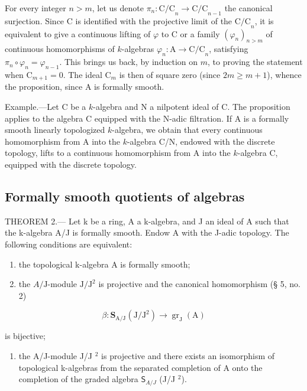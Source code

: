 For every integer \(n > m\), let us denote \(\pi_n: \mathrm{C/C}_n \to \mathrm{C/C}_{n-1}\) the canonical surjection. Since C is identified with the projective limit of the \(\mathrm{C/C}_n\), it is equivalent to give a continuous lifting of \(\varphi\) to C or a family \((\varphi_n)_{n > m}\) of continuous homomorphisms of \(k\)-algebras \(\varphi_n: \mathrm{A} \to \mathrm{C/C}_n\), satisfying \(\pi_n \circ \varphi_n = \varphi_{n-1}\). This brings us back, by induction on \(m\), to proving the statement when \(\mathrm{C}_{m+1} = 0\). The ideal \(\mathrm{C}_m\) is then of square zero (since \(2m \geqslant m+1\)), whence the proposition, since A is formally smooth.

Example.—Let C be a \(k\)-algebra and N a nilpotent ideal of C. The proposition applies to the algebra C equipped with the N-adic filtration. If A is a formally smooth linearly topologized \(k\)-algebra, we obtain that every continuous homomorphism from A into the \(k\)-algebra C/N, endowed with the discrete topology, lifts to a continuous homomorphism from A into the \(k\)-algebra C, equipped with the discrete topology.

\subsection{Formally smooth quotients of algebras}

THEOREM 2.--- Let k be a ring, A a k-algebra, and J an ideal of A such that the k-algebra A/J is formally smooth. Endow A with the J-adic topology. The following conditions are equivalent:

\begin{enumerate}
\def\labelenumi{(\roman{enumi})}
\item
  the topological k-algebra A is formally smooth;
\item
  the \(A/\mathrm{J}\)-module \(\mathrm{J}/\mathrm{J}^2\) is projective and the canonical homomorphism (§ 5, no. 2)
\end{enumerate}

\[
\beta : \mathbf {S} _ {\mathrm{A/J}} (\mathrm{J} / \mathrm{J} ^ {2}) \rightarrow \operatorname{gr} _ {\mathrm{J}} (\mathrm{A})
\]

is bijective;

\begin{enumerate}
\def\labelenumi{(\roman{enumi})}
\setcounter{enumi}{2}
\tightlist
\item
  the A/J-module J/J \(^{2}\) is projective and there exists an isomorphism of topological k-algebras from the separated completion of A onto the completion of the graded algebra \(\mathsf{S}_{A/J}\) (J/J \(^{2}\)).
\end{enumerate}

